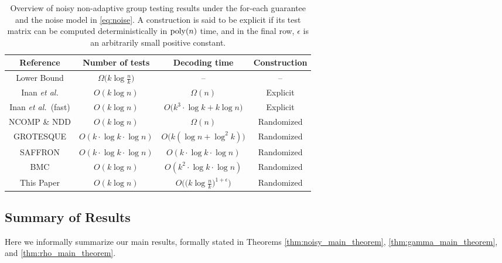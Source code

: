 \begin{table} [t]
    \centering
    \begin{tabular}{|c|c|c|c|}
        \hline
        Reference & Number of tests & Decoding time & Construction \\
        \hline \hline
        Lower Bound \cite{Mal78} & $\Omega\big(k\log\frac{n}{k}\big)$ & -- & -- \\
        Inan {\em et al.} \cite{Ina19} & $O(k\log n)$ & $\Omega(n)$ & Explicit \\
        Inan {\em et al.}~(fast) \cite{Ina20} & $O(k\log n)$ & $O\big(k^3\cdot\log k+k\log n\big)$ & Explicit \\
        NCOMP \& NDD \cite{Cha14,Sca18b} & $O(k\log n)$ & $\Omega(n)$ & Randomized \\
        GROTESQUE \cite{Cai13} & $O(k\cdot\log k\cdot\log n)$ & $O\big(k(\log n+\log^2k)\big)$ & Randomized \\
        SAFFRON \cite{Lee16} & $O(k\cdot\log k\cdot\log n)$ & $O(k\cdot\log k\cdot \log n)$ & Randomized \\
        BMC \cite{Bon19a} & $O(k\log n)$ & $O(k^2\cdot \log k\cdot \log n)$ & Randomized \\
        This Paper & $O(k\log n)$ & $O\big(\big(k\log\frac{n}{k}\big)^{1+\epsilon}\big)$ & Randomized \\
        \hline
    \end{tabular}
    \caption{Overview of noisy non-adaptive group testing results under the for-each guarantee and the noise model in \eqref{eq:noise}. A construction is said to be explicit if its test matrix can be computed deterministically in ${\rm poly}(n)$ time, and in the final row, $\epsilon$ is an arbitrarily small positive constant.}
    \label{tab:noisy_algo_summary}
\end{table}

\subsection{Summary of Results}

Here we informally summarize our main results, formally stated in Theorems \ref{thm:noisy_main_theorem}, \ref{thm:gamma_main_theorem}, and \ref{thm:rho_main_theorem}.

